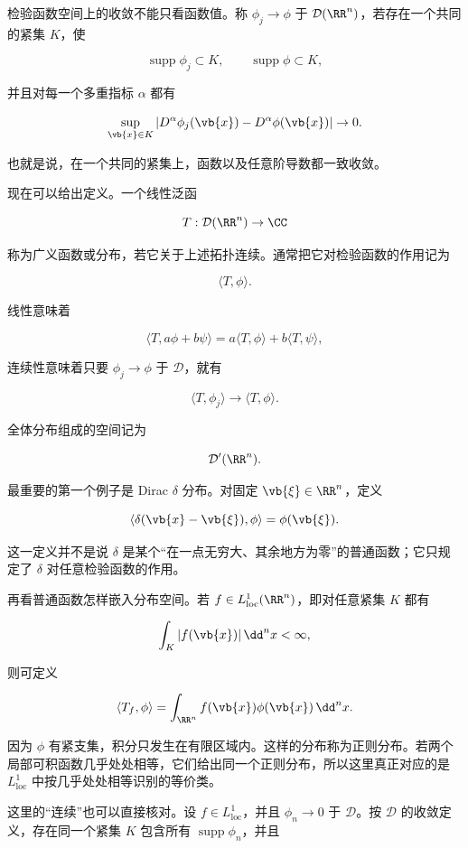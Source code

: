 检验函数空间上的收敛不能只看函数值。称 $\phi_j\to\phi$ 于 $\mathcal D(\RR^n)$，若存在一个共同的紧集 $K$，使

\[
\operatorname{supp}\phi_j\subset K,
\qquad
\operatorname{supp}\phi\subset K,
\]

并且对每一个多重指标 $\alpha$ 都有

\[
\sup_{\vb{x}\in K}
|D^\alpha\phi_j(\vb{x})-D^\alpha\phi(\vb{x})|\to0.
\]

也就是说，在一个共同的紧集上，函数以及任意阶导数都一致收敛。

现在可以给出定义。一个线性泛函

\[
T:\mathcal D(\RR^n)\to\CC
\]

称为广义函数或分布，若它关于上述拓扑连续。通常把它对检验函数的作用记为

\[
\langle T,\phi\rangle.
\]

线性意味着

\[
\langle T,a\phi+b\psi\rangle
=a\langle T,\phi\rangle+b\langle T,\psi\rangle,
\]

连续性意味着只要 $\phi_j\to\phi$ 于 $\mathcal D$，就有

\[
\langle T,\phi_j\rangle\to\langle T,\phi\rangle.
\]

全体分布组成的空间记为

\[
\mathcal D'(\RR^n).
\]

最重要的第一个例子是 Dirac $\delta$ 分布。对固定 $\vb{\xi}\in\RR^n$，定义

\[
{
\langle\delta(\vb{x}-\vb{\xi}),\phi\rangle
=\phi(\vb{\xi})
}.
\]

这一定义并不是说 $\delta$ 是某个``在一点无穷大、其余地方为零''的普通函数；它只规定了 $\delta$ 对任意检验函数的作用。

再看普通函数怎样嵌入分布空间。若 $f\in L^1_{\mathrm{loc}}(\RR^n)$，即对任意紧集 $K$ 都有

\[
\int_K|f(\vb{x})|\,\dd^n x<\infty,
\]

则可定义

\[
{
\langle T_f,\phi\rangle
=\int_{\RR^n}f(\vb{x})\phi(\vb{x})\,\dd^n x
}.
\]

因为 $\phi$ 有紧支集，积分只发生在有限区域内。这样的分布称为正则分布。若两个局部可积函数几乎处处相等，它们给出同一个正则分布，所以这里真正对应的是 $L^1_{\mathrm{loc}}$ 中按几乎处处相等识别的等价类。

这里的``连续''也可以直接核对。设 $f\in L^1_{\mathrm{loc}}$，并且 $\phi_n\to0$ 于 $\mathcal D$。按 $\mathcal D$ 的收敛定义，存在同一个紧集 $K$ 包含所有 $\operatorname{supp}\phi_n$，并且


